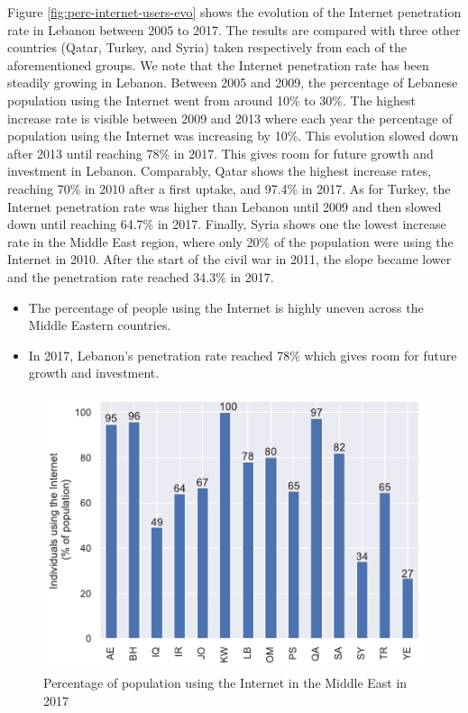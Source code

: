 \documentclass[a4paper,titlepage]{article}
\begin{document}
Figure \ref{fig:perc-internet-users-evo} shows the evolution of the Internet penetration rate in Lebanon between 2005 to 2017. The results are compared with three other countries (Qatar, Turkey, and Syria) taken respectively from each of the aforementioned groups. We note that the Internet penetration rate has been steadily growing in Lebanon. Between 2005 and 2009, the percentage of Lebanese population using the Internet went from around 10\% to 30\%. The highest increase rate is visible between 2009 and 2013 where each year the percentage of population using the Internet was increasing by 10\%. This evolution slowed down after 2013 until reaching 78\% in 2017. This gives room for future growth and investment in Lebanon. Comparably, Qatar shows the highest increase rates, reaching 70\% in 2010 after a first uptake, and 97.4\% in 2017. As for Turkey, the Internet penetration rate was higher than Lebanon until 2009 and then slowed down until reaching 64.7\% in 2017. Finally, Syria shows one the lowest increase rate in the Middle East region, where only 20\% of the population were using the Internet in 2010. After the start of the civil war in 2011, the slope became lower and the penetration rate reached 34.3\% in 2017.  

\begin{tcolorbox}[title=Highlights]
    \begin{itemize}
        \item The percentage of people using the Internet is highly uneven across the Middle Eastern countries.
        \item In 2017, Lebanon’s penetration rate reached 78\% which gives room for future growth and investment.
    \end{itemize}
\end{tcolorbox}

\begin{figure}
    \centering
    \includegraphics[width=0.75\linewidth]{../output/internet-users-2017.pdf}
    \caption{Percentage of population using the Internet in the Middle East in 2017}
    \label{fig:perc-internet-users-2017}
\end{figure}
\end{document}
